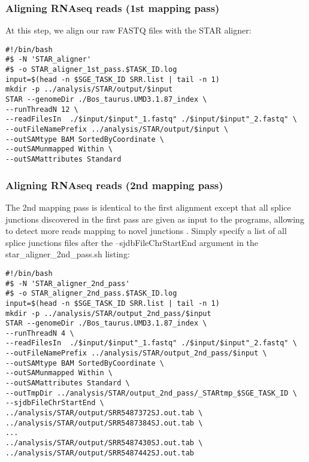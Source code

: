 \subsubsection{Aligning RNAseq reads (1st mapping pass)}

At this step, we align our raw FASTQ files with the STAR aligner:

\begin{verbatim}
#!/bin/bash
#$ -N 'STAR_aligner'
#$ -o STAR_aligner_1st_pass.$TASK_ID.log
input=$(head -n $SGE_TASK_ID SRR.list | tail -n 1)
mkdir -p ../analysis/STAR/output/$input
STAR --genomeDir ./Bos_taurus.UMD3.1.87_index \
--runThreadN 12 \
--readFilesIn  ./$input/$input"_1.fastq" ./$input/$input"_2.fastq" \
--outFileNamePrefix ../analysis/STAR/output/$input \
--outSAMtype BAM SortedByCoordinate \
--outSAMunmapped Within \
--outSAMattributes Standard
\end{verbatim}



\subsubsection{Aligning RNAseq reads (2nd mapping pass)}

The 2nd mapping pass is identical to the first alignment except that all splice junctions discovered in the first pass are given as input to the programs, allowing to detect more reads mapping to novel junctions  \cite{Dobin2013}. Simply specify a list of all splice junctions files after the --sjdbFileChrStartEnd argument in the star\_aligner\_2nd\_pass.sh listing:

\begin{verbatim}
#!/bin/bash
#$ -N 'STAR_aligner_2nd_pass'
#$ -o STAR_aligner_2nd_pass.$TASK_ID.log
input=$(head -n $SGE_TASK_ID SRR.list | tail -n 1)
mkdir -p ../analysis/STAR/output_2nd_pass/$input
STAR --genomeDir ./Bos_taurus.UMD3.1.87_index \
--runThreadN 4 \
--readFilesIn  ./$input/$input"_1.fastq" ./$input/$input"_2.fastq" \
--outFileNamePrefix ../analysis/STAR/output_2nd_pass/$input \
--outSAMtype BAM SortedByCoordinate \
--outSAMunmapped Within \
--outSAMattributes Standard \
--outTmpDir ../analysis/STAR/output_2nd_pass/_STARtmp_$SGE_TASK_ID \
--sjdbFileChrStartEnd \
../analysis/STAR/output/SRR5487372SJ.out.tab \
../analysis/STAR/output/SRR5487384SJ.out.tab \
...
../analysis/STAR/output/SRR5487430SJ.out.tab \
../analysis/STAR/output/SRR5487442SJ.out.tab
\end{verbatim}



